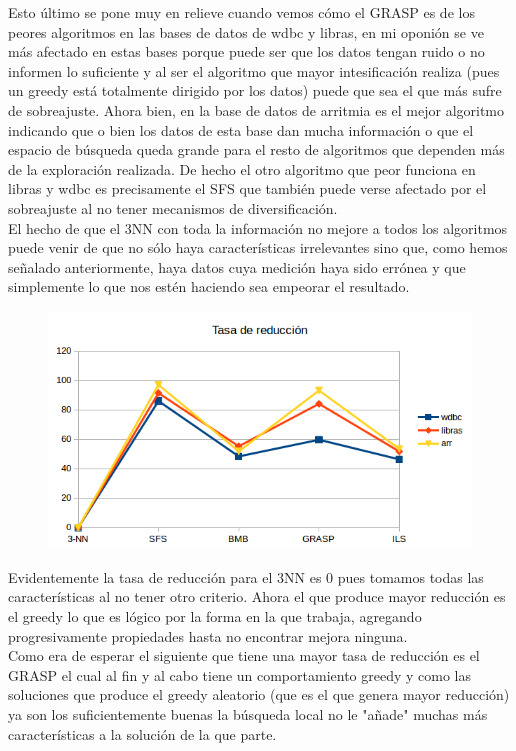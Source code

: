 \documentclass[10pt,a4paper]{article}
\begin{document}
Esto último se pone muy en relieve cuando vemos cómo el GRASP es de los peores algoritmos en las bases de datos de wdbc y libras, en mi oponión se ve más afectado en estas bases porque puede ser que los datos tengan ruido o no informen lo suficiente y al ser el algoritmo que mayor intesificación realiza (pues un greedy está totalmente dirigido por los datos) puede que sea el que más sufre de sobreajuste. Ahora bien, en la base de datos de arritmia es el mejor algoritmo indicando que o bien los datos de esta base dan mucha información o que el espacio de búsqueda queda grande para el resto de algoritmos que dependen más de la exploración realizada. De hecho el otro algoritmo que peor funciona en libras y wdbc es precisamente el SFS que también puede verse afectado por el sobreajuste al no tener mecanismos de diversificación.\\

El hecho de que el 3NN con toda la información no mejore a todos los algoritmos puede venir de que no sólo haya características irrelevantes sino que, como hemos señalado anteriormente, haya datos cuya medición haya sido errónea y que simplemente lo que nos estén haciendo sea empeorar el resultado.\\

\begin{figure}[H]
\centering
\includegraphics[width=130mm]{reduccion.png}
\end{figure}

Evidentemente la tasa de reducción para el 3NN es 0 pues tomamos todas las características al no tener otro criterio. Ahora el que produce mayor reducción es el greedy lo que es lógico por la forma en la que trabaja, agregando progresivamente propiedades hasta no encontrar mejora ninguna.\\

Como era de esperar el siguiente que tiene una mayor tasa de reducción es el GRASP el cual al fin y al cabo tiene un comportamiento greedy y como las soluciones que produce el greedy aleatorio (que es el que genera mayor reducción) ya son los suficientemente buenas la búsqueda local no le "añade" muchas más características a la solución de la que parte.
\end{document}
